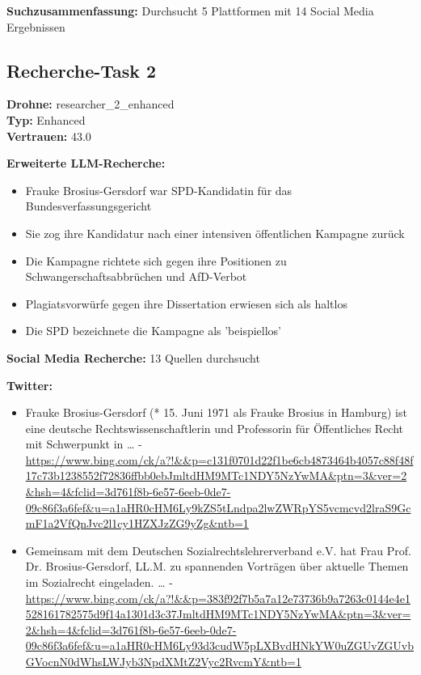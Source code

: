 \documentclass[12pt,a4paper]{article}
\begin{document}
\textbf{Suchzusammenfassung:} Durchsucht 5 Plattformen mit 14 Social Media Ergebnissen

\subsection{Recherche-Task 2}

\textbf{Drohne:} researcher\_2\_enhanced\\
\textbf{Typ:} Enhanced\\
\textbf{Vertrauen:} 43.0%

\textbf{Erweiterte LLM-Recherche:}
\begin{itemize}
\item Frauke Brosius-Gersdorf war SPD-Kandidatin für das Bundesverfassungsgericht
\item Sie zog ihre Kandidatur nach einer intensiven öffentlichen Kampagne zurück
\item Die Kampagne richtete sich gegen ihre Positionen zu Schwangerschaftsabbrüchen und AfD-Verbot
\item Plagiatsvorwürfe gegen ihre Dissertation erwiesen sich als haltlos
\item Die SPD bezeichnete die Kampagne als 'beispiellos'
\end{itemize}

\textbf{Social Media Recherche:} 13 Quellen durchsucht

\textbf{Twitter:}
\begin{itemize}
\item Frauke Brosius-Gersdorf (* 15. Juni 1971 als Frauke Brosius in Hamburg) ist eine deutsche Rechtswissenschaftlerin und Professorin für Öffentliches Recht mit Schwerpunkt in … - \url{https://www.bing.com/ck/a?!&&p=c131f0701d22f1be6cb4873464b4057c88f48f17c73b1238552f72836ffbb0ebJmltdHM9MTc1NDY5NzYwMA&ptn=3&ver=2&hsh=4&fclid=3d761f8b-6e57-6eeb-0de7-09c86f3a6fef&u=a1aHR0cHM6Ly9kZS5tLndpa2lwZWRpYS5vcmcvd2lraS9GcmF1a2VfQnJvc2l1cy1HZXJzZG9yZg&ntb=1}
\item Gemeinsam mit dem Deutschen Sozialrechtslehrerverband e.V. hat Frau Prof. Dr. Brosius-Gersdorf, LL.M. zu spannenden Vorträgen über aktuelle Themen im Sozialrecht eingeladen. … - \url{https://www.bing.com/ck/a?!&&p=383f92f7b5a7a12e73736b9a7263c0144e4e1528161782575d9f14a1301d3c37JmltdHM9MTc1NDY5NzYwMA&ptn=3&ver=2&hsh=4&fclid=3d761f8b-6e57-6eeb-0de7-09c86f3a6fef&u=a1aHR0cHM6Ly93d3cudW5pLXBvdHNkYW0uZGUvZGUvbGVocnN0dWhsLWJyb3NpdXMtZ2Vyc2RvcmY&ntb=1}
\end{itemize}
\end{document}
